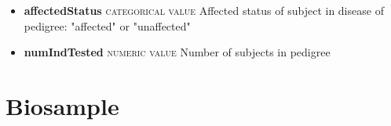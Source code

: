 \documentclass[a4paper, 10pt]{article}        %
\begin{document}
\begin{description}
\begin{itemize}

			\item[] \textbf{affectedStatus} {\textsc{categorical value}} Affected status of subject in disease of pedigree: "affected" or "unaffected"
			\item[] \textbf{numIndTested} {\textsc{numeric value}} Number of subjects in pedigree
	\end{itemize}


 \end{description}

  
  \section*{ {\color{teal} Biosample}}
  
\end{document}
